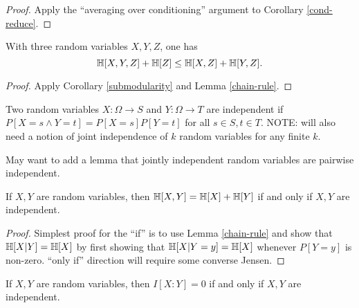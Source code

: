 \begin{proof}  Apply the ``averaging over conditioning'' argument to Corollary \ref{cond-reduce}.
\end{proof}

\begin{corollary}\label{alt-submodularity}
  \leanok
  With three random variables $X,Y,Z$, one has
  $$ \mathbb{H}[X,Y,Z] + \mathbb{H}[Z] \leq \mathbb{H}[X,Z] + \mathbb{H}[Y,Z].$$
\end{corollary}

\begin{proof}   Apply Corollary \ref{submodularity} and Lemma \ref{chain-rule}.
\end{proof}

\begin{definition}
  \label{independent-def}
  \leanok
  Two random variables $X: \Omega \to S$ and $Y: \Omega \to T$ are independent if $P[ X = s \wedge Y = t] = P[X=s] P[Y=t]$ for all $s \in S, t \in T$.  NOTE: will also need a notion of joint independence of $k$ random variables for any finite $k$.
\end{definition}

May want to add a lemma that jointly independent random variables are pairwise independent.

\begin{lemma}\label{add-entropy}
  \leanok
  If $X,Y$ are random variables, then $\mathbb{H}[X,Y] = \mathbb{H}[X] + \mathbb{H}[Y]$ if and only if $X,Y$ are independent.
\end{lemma}

\begin{proof}  Simplest proof for the ``if'' is to use Lemma \ref{chain-rule} and show that $\mathbb{H}[X|Y] = \mathbb{H}[X]$ by first showing that $\mathbb{H}[X|Y=y] = \mathbb{H}[X]$ whenever $P[Y=y]$ is non-zero.  ``only if'' direction will require some converse Jensen.
\end{proof}


\begin{corollary}
\label{vanish-entropy}
\leanok
If $X,Y$ are random variables, then $I[X:Y] = 0$ if and only if $X,Y$ are independent.
\end{corollary}

